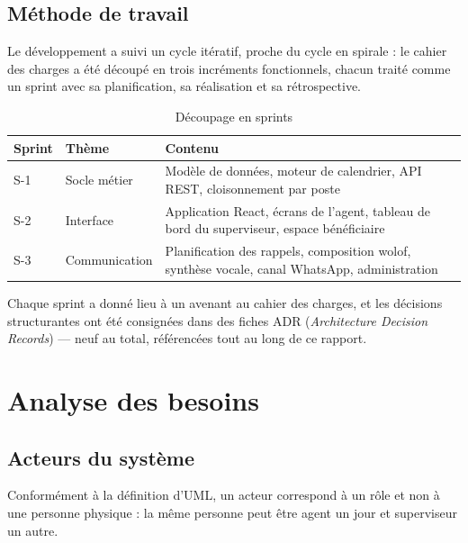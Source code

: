 \documentclass[11pt,a4paper]{report}
\begin{document}
\section{Méthode de travail}

Le développement a suivi un cycle itératif, proche du cycle en spirale : le
cahier des charges a été découpé en trois incréments fonctionnels, chacun
traité comme un sprint avec sa planification, sa réalisation et sa
rétrospective.

\begin{table}[H]
\centering
\begin{tabularx}{\textwidth}{@{}llX@{}}
\toprule
\textbf{Sprint} & \textbf{Thème} & \textbf{Contenu} \\
\midrule
S-1 & Socle métier & Modèle de données, moteur de calendrier, API REST,
cloisonnement par poste \\
S-2 & Interface & Application React, écrans de l'agent, tableau de bord du
superviseur, espace bénéficiaire \\
S-3 & Communication & Planification des rappels, composition wolof,
synthèse vocale, canal WhatsApp, administration \\
\bottomrule
\end{tabularx}
\caption{Découpage en sprints}
\end{table}

Chaque sprint a donné lieu à un avenant au cahier des charges, et les
décisions structurantes ont été consignées dans des fiches ADR
(\emph{Architecture Decision Records}) — neuf au total, référencées tout au
long de ce rapport.

\chapter{Analyse des besoins}

\section{Acteurs du système}

Conformément à la définition d'UML, un acteur correspond à un rôle et non à
une personne physique : la même personne peut être agent un jour et
superviseur un autre.
\end{document}
